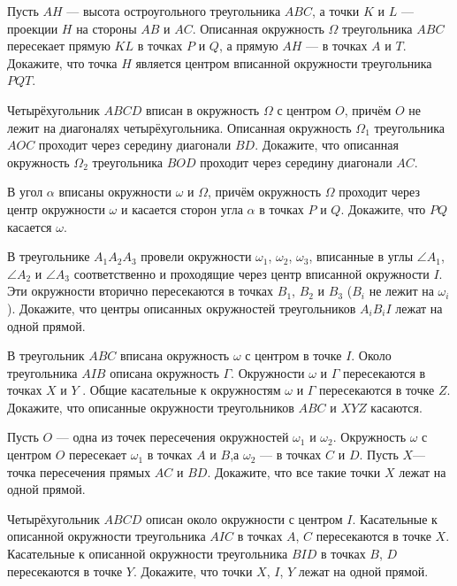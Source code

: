 \documentclass{article}
\begin{document}
\begin{enumerate_boxed}
        \item Пусть $AH$ — высота остроугольного треугольника $ABC$, а точки $K$ и $L$ — проекции $H$ на стороны $AB$ и $AC$.
        Описанная окружность $\Omega$ треугольника $ABC$ пересекает прямую $KL$ в точках $P$ и $Q$, а прямую $AH$ — в точках $A$ и $T$.
        Докажите, что точка $H$ является центром вписанной окружности треугольника $PQT$.

        \item Четырёхугольник $ABCD$ вписан в окружность $\Omega$ с центром $O$, причём $O$ не лежит на диагоналях четырёхугольника.
        Описанная окружность $\Omega_1$ треугольника $AOC$ проходит через середину диагонали $BD$.
        Докажите, что описанная окружность $\Omega_2$ треугольника $BOD$ проходит через середину диагонали $AC$.

        \item В угол $\alpha$ вписаны окружности $\omega$ и $\Omega$, причём окружность $\Omega$ проходит через центр окружности $\omega$ и касается сторон угла $\alpha$ в точках $P$ и $Q$.
        Докажите, что $PQ$ касается $\omega$.

        \item В треугольнике $A_{1}A_{2}A_3$ провели окружности $\omega_1$, $\omega_2$, $\omega_3$, вписанные в углы $\angle A_1$, $\angle A_2$ и $\angle A_3$ соответственно и проходящие через центр вписанной окружности $I$.
        Эти окружности вторично пересекаются в точках $B_1$, $B_2$ и $B_3$ ($B_i$ не лежит на $\omega_i$). Докажите, что центры описанных окружностей треугольников $A_{i}B_{i}I$ лежат на одной прямой.

        \item В треугольник $ABC$ вписана окружность $\omega$ с центром в точке $I$.
        Около треугольника $AIB$ описана окружность $\Gamma$.
        Окружности $\omega$ и $\Gamma$ пересекаются в точках $X$ и $Y$ .
        Общие касательные к окружностям $\omega$ и $\Gamma$ пересекаются в точке $Z$.
        Докажите, что описанные окружности треугольников $ABC$ и $XYZ$ касаются.

        \item Пусть $O$ — одна из точек пересечения окружностей $\omega_1$ и $\omega_2$.
        Окружность $\omega$ с центром $O$ пересекает $\omega_1$ в точках $A$ и $B$,а $\omega_2$ — в точках $C$ и $D$.
        Пусть $X$— точка пересечения прямых $AC$ и $BD$.
        Докажите, что все такие точки $X$ лежат на одной прямой.

        \item Четырёхугольник $ABCD$ описан около окружности с центром $I$.
        Касательные к описанной окружности треугольника $AIC$ в точках $A$, $C$ пересекаются в точке $X$.
        Касательные к описанной окружности треугольника $BID$ в точках $B$, $D$ пересекаются в точке $Y$.
        Докажите, что точки $X$, $I$, $Y$ лежат на одной прямой.


\end{enumerate_boxed}
\end{document}

